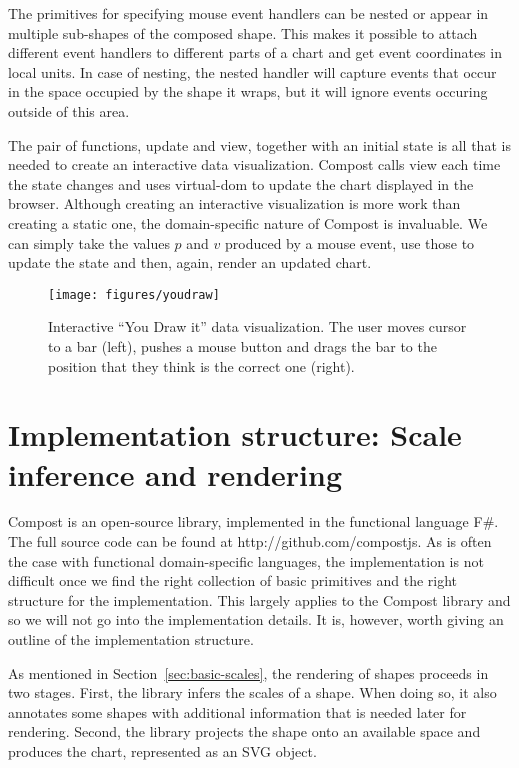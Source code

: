 \documentclass{jfp}
\newcommand{\ident}[1]{\textnormal{\textcolor{idclr}{\sffamily #1}}}
\newcommand{\urrl}[1]{\textnormal{\textcolor{urlclr}{#1}}}
\begin{document}
The primitives for specifying mouse event handlers can be nested or appear in multiple sub-shapes
of the composed shape. This makes it possible to attach different event handlers to different
parts of a chart and get event coordinates in local units. In case of nesting, the nested handler
will capture events that occur in the space occupied by the shape it wraps, but it will ignore
events occuring outside of this area.

The pair of functions, \ident{update} and \ident{view}, together with an initial state is
all that is needed to create an interactive data visualization. Compost calls
\ident{view} each time the state changes and uses virtual-dom to update the chart
displayed in the browser. Although creating an interactive visualization is more work than
creating a static one, the domain-specific nature of Compost is invaluable. We can
simply take the values $p$ and $v$ produced by a mouse event, use those to update the state
and then, again, render an updated chart.

\begin{figure}[t]
  \texttt{[image: figures/youdraw]}
  \vspace{1em}
  \caption{Interactive ``You Draw it'' data visualization. The user moves cursor to a bar (left),
    pushes a mouse button and drags the bar to the position that they think is the correct one (right).}
  \label{fig:youdraw}
\end{figure}


\section{Implementation structure: Scale inference and rendering}
\label{sec:impl}

Compost is an open-source library, implemented in the functional language F\#. The full source
code can be found at \urrl{http://github.com/compostjs}.
As is often the case with functional domain-specific languages, the implementation is not difficult
once we find the right collection of basic primitives and the right structure for the implementation.
This largely applies to the Compost library and so we will not go into the implementation details.
It is, however, worth giving an outline of the implementation structure.

As mentioned in Section~\ref{sec:basic-scales}, the rendering of shapes proceeds in two stages.
First, the library infers the scales of a shape. When doing so, it also annotates some shapes
with additional information that is needed later for rendering. Second, the library projects
the shape onto an available space and produces the chart, represented as an SVG object.
\end{document}

